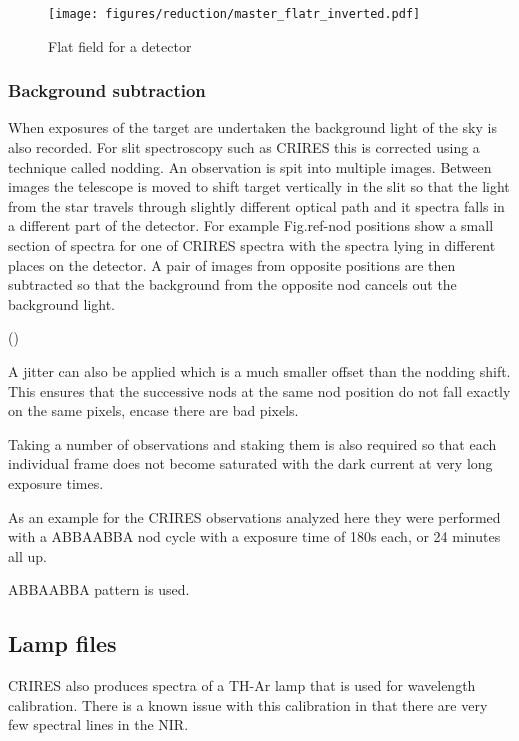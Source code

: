 \begin{figure}[h]
    \centering
    \texttt{[image: figures/reduction/master\_flatr\_inverted.pdf]}
    \caption{Flat field for a detector}
\end{figure}


\subsubsection{Background subtraction}

When exposures of the target are undertaken the background light of the sky is also recorded. For slit spectroscopy such as CRIRES this is corrected using a technique called nodding. An observation is spit into multiple images. Between images the telescope is moved to shift target vertically in the slit so that the light from the star travels through slightly different optical path and it spectra falls in a different part of the detector. 
For example Fig.ref-nod positions show a small section of spectra for one of CRIRES spectra with the spectra lying in different places on the detector. A pair of images from opposite positions are then subtracted so that the background from the opposite nod cancels out the background light.

\missingfigure()

A jitter can also be applied which is a much smaller offset than the nodding shift. This ensures that the successive nods at the same nod position do not fall exactly on the same pixels, encase there are bad pixels.

Taking a number of observations and staking them is also required so that each individual frame does not become saturated with the dark current at very long exposure times.

As an example for the CRIRES observations analyzed here they were performed with a ABBAABBA nod cycle with a exposure time of 180s each, or 24 minutes all up.



ABBAABBA  pattern is used.

\subsection{Lamp files}
CRIRES also produces spectra of a TH-Ar lamp that is used for wavelength calibration. There is a known issue with this calibration in that there are very few spectral lines in the NIR. 

